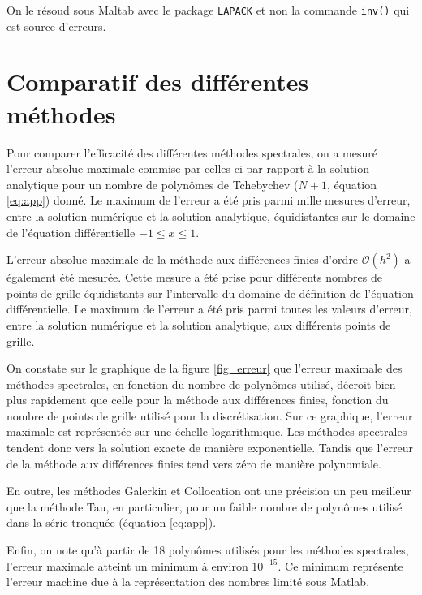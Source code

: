 \documentclass{report}
\begin{document}
On le résoud sous Maltab avec le package \texttt{LAPACK} et non la commande \texttt{inv()} qui est source d'erreurs.

\section{Comparatif des différentes méthodes}

Pour comparer l'efficacité des différentes méthodes spectrales, on a mesuré l'erreur absolue maximale commise par celles-ci par rapport à la solution analytique pour un nombre de polynômes de Tchebychev ($N+1$, équation \eqref{eq:app}) donné. Le maximum de l'erreur a été pris parmi mille mesures d'erreur, entre la solution numérique et la solution analytique, équidistantes sur le domaine de l'équation différentielle $-1\leq x \leq 1$.

L'erreur absolue maximale de la méthode aux différences finies d'ordre $\mathcal{O}(h^2)$ a également été mesurée. Cette mesure a été prise pour différents nombres de points de grille équidistants sur l'intervalle du domaine de définition de l'équation différentielle. Le maximum de l'erreur a été pris parmi toutes les valeurs d'erreur, entre la solution numérique et la solution analytique, aux  différents points de grille.

On constate sur le graphique de la figure \ref{fig_erreur} que l'erreur maximale des méthodes spectrales, en fonction du nombre de polynômes utilisé, décroit bien plus rapidement que celle pour la méthode aux différences finies, fonction du nombre de points de grille utilisé pour la discrétisation. Sur ce graphique, l'erreur maximale est représentée sur une échelle logarithmique. Les méthodes spectrales tendent donc vers la solution exacte de manière exponentielle. Tandis que l'erreur de la méthode aux différences finies tend vers zéro de manière polynomiale.

En outre, les méthodes Galerkin et Collocation ont une précision un peu meilleur que la méthode Tau, en particulier, pour un faible nombre de polynômes utilisé dans la série tronquée (équation \eqref{eq:app}).

Enfin, on note qu'à partir de 18 polynômes utilisés pour les méthodes spectrales, l'erreur maximale atteint un minimum à environ $10^{-15}$. Ce minimum représente l'erreur machine due à la représentation des nombres limité sous Matlab.
\end{document}
